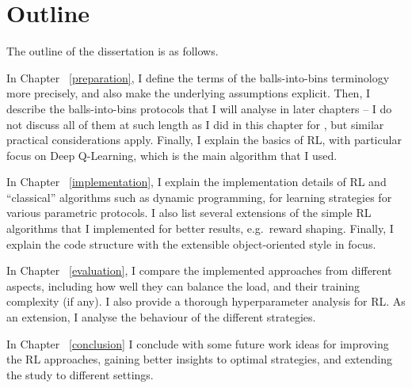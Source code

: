 

\section{Outline}

The outline of the dissertation is as follows.


In Chapter ~\ref{preparation}, I define the terms of the balls-into-bins terminology more precisely, and also make the underlying assumptions explicit. Then, I describe the balls-into-bins protocols that I will analyse in later chapters -- I do not discuss all of them at such length as I did in this chapter for \TwoThinning, but similar practical considerations apply. Finally, I explain the basics of RL, with particular focus on Deep Q-Learning, which is the main algorithm that I used.


In Chapter ~\ref{implementation}, I explain the implementation details of RL and ``classical'' algorithms such as dynamic programming, for learning strategies for various parametric protocols. I also list several extensions of the simple RL algorithms that I implemented for better results, e.g.\ reward shaping. Finally, I explain the code structure with the extensible object-oriented style in focus.


In Chapter ~\ref{evaluation}, I compare the implemented approaches from different aspects, including how well they can balance the load, and their training complexity (if any). I also provide a thorough hyperparameter analysis for RL. As an extension, I analyse the behaviour of the different strategies. 


In Chapter ~\ref{conclusion} I conclude with some future work ideas for improving the RL approaches, gaining better insights to optimal strategies, and extending the study to different settings.